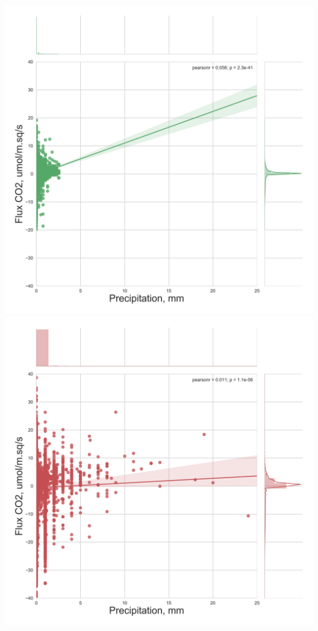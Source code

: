 \documentclass{beamer}
\begin{document}
\begin{frame}
\begin{columns}[t]
\includegraphics[width=\textwidth]{FvsP/CA-NS6.png}\\
\includegraphics[width=\textwidth]{FvsP/CA-Oas.png}

\end{columns}
\end{frame}
\end{document}
